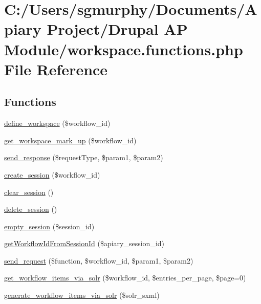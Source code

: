 \hypertarget{workspace_8functions_8php}{
\section{C:/Users/sgmurphy/Documents/Apiary Project/Drupal AP Module/workspace.functions.php File Reference}
\label{workspace_8functions_8php}
}
\subsection*{Functions}
\begin{DoxyCompactItemize}
\item 
\hyperlink{workspace_8functions_8php_ac0cbb6a19004dceed34436c6ecbdb7f0}{define\_\-workspace} (\$workflow\_\-id)
\item 
\hyperlink{workspace_8functions_8php_a05c9eec0f69c46b0efede510a10c78c3}{get\_\-workspace\_\-mark\_\-up} (\$workflow\_\-id)
\item 
\hyperlink{workspace_8functions_8php_a74d87fc4a909ee407ee6c234183fae9d}{send\_\-response} (\$requestType, \$param1, \$param2)
\item 
\hyperlink{workspace_8functions_8php_a9f7db1db0cc821c4c64c17df1c48bb23}{create\_\-session} (\$workflow\_\-id)
\item 
\hyperlink{workspace_8functions_8php_ac5cf9b9706e3ebd83fd59a8003dea5cb}{clear\_\-session} ()
\item 
\hyperlink{workspace_8functions_8php_ae78eade784cc317e8ec88ff0952e492f}{delete\_\-session} ()
\item 
\hyperlink{workspace_8functions_8php_ae709f2164c1170596205abd99623482d}{empty\_\-session} (\$session\_\-id)
\item 
\hyperlink{workspace_8functions_8php_ae6e87527dc49b6e11a52142922d0614e}{getWorkflowIdFromSessionId} (\$apiary\_\-session\_\-id)
\item 
\hyperlink{workspace_8functions_8php_a966df1417fa7c1acd731bea57a21cdfb}{send\_\-request} (\$function, \$workflow\_\-id, \$param1, \$param2)
\item 
\hyperlink{workspace_8functions_8php_a228baa05e8acda612b60685412607100}{get\_\-workflow\_\-items\_\-via\_\-solr} (\$workflow\_\-id, \$entries\_\-per\_\-page, \$page=0)
\item 
\hyperlink{workspace_8functions_8php_a2fcfd59c37ffd7906e09b79ea7a1a55f}{generate\_\-workflow\_\-items\_\-via\_\-solr} (\$solr\_\-sxml)

\end{DoxyCompactItemize}
